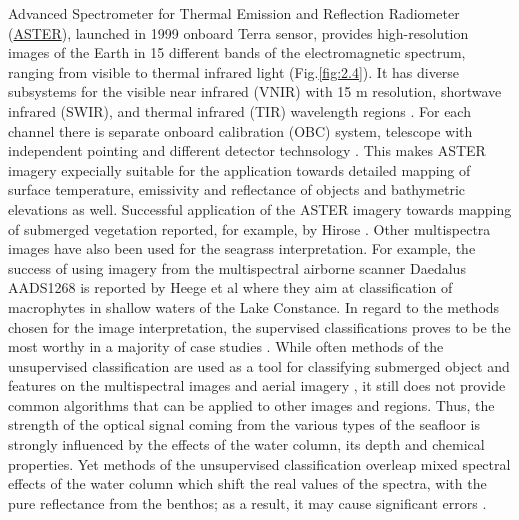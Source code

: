 \documentclass[10pt, a4paper]{article}
\begin{document}
Advanced Spectrometer for Thermal Emission and Reflection Radiometer (\href{http://asterweb.jpl.nasa.gov/}{ASTER}), launched in
1999 onboard Terra sensor, provides high-resolution images of the Earth in 15 different bands of the
electromagnetic spectrum, ranging from visible to thermal infrared light  (Fig.\ref{fig:2.4}). It has diverse
subsystems for the visible near infrared (VNIR) with 15 m resolution, shortwave infrared (SWIR), and
thermal infrared (TIR) wavelength regions \cite{Kalinowski04}\label{Kalinowski04}. For each channel there is separate
onboard calibration (OBC) system, telescope with independent pointing and different detector technsology \cite{Arai05}\label{Arai05}. 
This makes ASTER imagery expecially suitable for the application towards detailed
mapping of surface temperature, emissivity and reflectance of objects and bathymetric elevations as
well. Successful application of the ASTER imagery towards mapping of submerged vegetation
reported, for example, by Hirose \cite{Hirose04} \label{Hirose04}. Other multispectra images have also been used for the
seagrass interpretation. For example, the success of using imagery from the multispectral airborne
scanner Daedalus AADS1268 is reported by Heege et al \cite{Heege03}\label{Heege03} where they aim at classification of
macrophytes in shallow waters of the Lake Constance.
In regard to the methods chosen for the image interpretation, the supervised classifications proves to
be the most worthy in a majority of case studies \cite{Palandro03,Peneva08}\label{Palandro03} \label{Peneva08}. While
often methods of the unsupervised classification are used as a tool for classifying submerged object
and features on the multispectral images and aerial imagery \cite{Fletcher09}\label{Fletcher09}, it still does not
provide common algorithms that can be applied to other images and regions. Thus, the strength of the
optical signal coming from the various types of the seafloor is strongly influenced by the effects of the
water column, its depth and chemical properties. Yet methods of the unsupervised classification
overleap mixed spectral effects of the water column which shift the real values of the spectra, with the
pure reflectance from the benthos; as a result, it may cause significant errors \cite{Dierssen03}\label{Dierssen03}.
\end{document}
